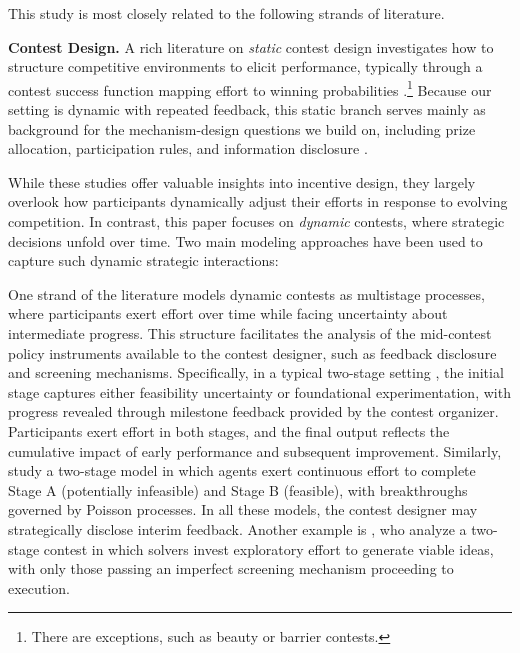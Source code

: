 \documentclass[mnsc]{informs3}
\begin{document}
This study is most closely related to the following strands of literature.

\textbf{Contest Design.}
A rich literature on \textit{static} contest design \citep{ales2017optimal_award} investigates how to structure competitive environments to elicit performance, typically through a contest success function mapping effort to winning probabilities \citep{skaperdas1996contest}.\footnote{There are exceptions, such as beauty or barrier contests.}
Because our setting is dynamic with repeated feedback, this static branch serves mainly as background for the mechanism-design questions we build on, including prize allocation, participation rules, and information disclosure \citep{moldovanu2001optimal, ales2021number_of_players, bergemann2022optimal}.


While these studies offer valuable insights into incentive design, they largely overlook how participants dynamically adjust their efforts in response to evolving competition.
In contrast, this paper focuses on \textit{dynamic} contests, where strategic decisions unfold over time.
Two main modeling approaches have been used to capture such dynamic strategic interactions:

One strand of the literature models dynamic contests as multistage processes, where participants exert effort over time while facing uncertainty about intermediate progress.
This structure facilitates the analysis of the mid-contest policy instruments available to the contest designer, such as feedback disclosure and screening mechanisms.
Specifically, in a typical two-stage setting \citep{aoyagi2010information, mihm2019feedback}, the initial stage captures either feasibility uncertainty or foundational experimentation, with progress revealed through milestone feedback provided by the contest organizer.
Participants exert effort in both stages, and the final output reflects the cumulative impact of early performance and subsequent improvement.
Similarly, \citet{bimpikis2019designing} study a two-stage model in which agents exert continuous effort to complete Stage A (potentially infeasible) and Stage B (feasible), with breakthroughs governed by Poisson processes.
In all these models, the contest designer may strategically disclose interim feedback.
Another example is \citet{Khorasani2023screening}, who analyze a two-stage contest in which solvers invest exploratory effort to generate viable ideas, with only those passing an imperfect screening mechanism proceeding to execution.
\end{document}
